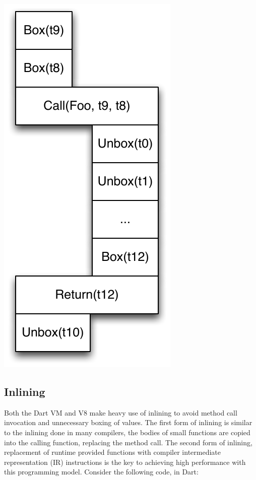 \documentclass[preprint]{sigplanconf}
\begin{document}
\includegraphics{figures/boxunboxbox-eps-converted-to.pdf}
\fi

\subsection{Inlining}
\label{inlining}

Both the Dart VM and V8 make heavy use of inlining to avoid method call
invocation and unnecessary boxing of values. The first form of inlining is
similar to the inlining done in many compilers, the bodies of small functions
are copied into the calling function, replacing the method call. The second form
of inlining, replacement of runtime provided functions with compiler
intermediate representation (IR) instructions is the key to achieving high
performance with this programming model. Consider the following code, in Dart:
\end{document}
